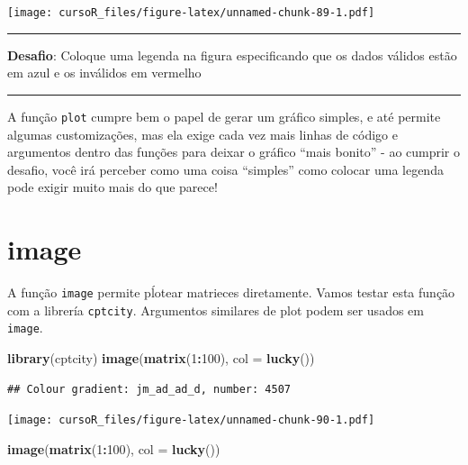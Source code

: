 \documentclass[]{book}
\newenvironment{Shaded}{\begin{snugshade}}{\end{snugshade}}
\newcommand{\KeywordTok}[1]{\textcolor[rgb]{0.13,0.29,0.53}{\textbf{#1}}}
\newcommand{\DataTypeTok}[1]{\textcolor[rgb]{0.13,0.29,0.53}{#1}}
\newcommand{\DecValTok}[1]{\textcolor[rgb]{0.00,0.00,0.81}{#1}}
\newcommand{\OperatorTok}[1]{\textcolor[rgb]{0.81,0.36,0.00}{\textbf{#1}}}
\newcommand{\NormalTok}[1]{#1}
\theoremstyle{definition}
\theoremstyle{definition}
\theoremstyle{definition}
\theoremstyle{remark}
\begin{document}
\texttt{[image: cursoR\_files/figure-latex/unnamed-chunk-89-1.pdf]}

\begin{center}\rule{0.5\linewidth}{\linethickness}\end{center}

{\textbf{Desafio}: Coloque uma legenda na figura especificando que os
dados válidos estão em azul e os inválidos em vermelho }

\begin{center}\rule{0.5\linewidth}{\linethickness}\end{center}

A função \texttt{plot} cumpre bem o papel de gerar um gráfico simples, e
até permite algumas customizações, mas ela exige cada vez mais linhas de
código e argumentos dentro das funções para deixar o gráfico ``mais
bonito'' - ao cumprir o desafio, você irá perceber como uma coisa
``simples'' como colocar uma legenda pode exigir muito mais do que
parece!

\section{image}\label{image}

A função \texttt{image} permite pĺotear matrieces diretamente. Vamos
testar esta função com a librería \texttt{cptcity}. Argumentos similares
de plot podem ser usados em \texttt{image}.

\begin{Shaded}
\begin{Highlighting}[]
\KeywordTok{library}\NormalTok{(cptcity)}
\KeywordTok{image}\NormalTok{(}\KeywordTok{matrix}\NormalTok{(}\DecValTok{1}\OperatorTok{:}\DecValTok{100}\NormalTok{), }\DataTypeTok{col =} \KeywordTok{lucky}\NormalTok{())}
\end{Highlighting}
\end{Shaded}

\begin{verbatim}
## Colour gradient: jm_ad_ad_d, number: 4507
\end{verbatim}

\texttt{[image: cursoR\_files/figure-latex/unnamed-chunk-90-1.pdf]}

\begin{Shaded}
\begin{Highlighting}[]
\KeywordTok{image}\NormalTok{(}\KeywordTok{matrix}\NormalTok{(}\DecValTok{1}\OperatorTok{:}\DecValTok{100}\NormalTok{), }\DataTypeTok{col =} \KeywordTok{lucky}\NormalTok{())}
\end{Highlighting}
\end{Shaded}
\end{document}
